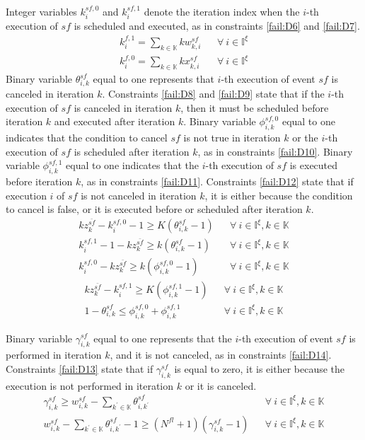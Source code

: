 \documentclass[suppldata]{interact}
\theoremstyle{plain}
\theoremstyle{definition}
\theoremstyle{remark}
\begin{document}
Integer variables $k^{sf,0}_i$ and $k^{sf,1}_{i}$ denote the iteration index when the $i$-th execution of ${sf}$ is scheduled and executed, as in constraints \eqref{fail:D6} and \eqref{fail:D7}. 
\begin{eqnarray}
	k^{f,1}_i=\sum_{k\in\mathbb{K}}kw^{sf}_{k,i}&&\forall\ i\in \mathbb{I}^{\xi}\label{fail:D6}\\
	k^{f,0}_i=\sum_{k\in\mathbb{K}}kx^{sf}_{k,i}&&\forall\ i\in \mathbb{I}^{\xi}\label{fail:D7}
\end{eqnarray}
Binary variable $\theta^{sf}_{i,k}$ equal to one represents that $i$-th execution of event ${sf}$ is canceled in iteration $k$. Constraints \eqref{fail:D8} and \eqref{fail:D9} state that if the $i$-th execution of ${sf}$ is canceled in iteration $k$, then it must be scheduled before iteration $k$ and executed after iteration $k$. Binary variable $\phi^{sf,0}_{i,k}$ equal to one indicates that the condition to cancel ${sf}$ is not true in iteration $k$ or the $i$-th execution of ${sf}$ is scheduled after iteration $k$, as in constraints \eqref{fail:D10}. Binary variable $\phi^{sf,1}_{i,k}$ equal to one indicates that the $i$-th execution of ${sf}$ is executed before iteration $k$, as in constraints \eqref{fail:D11}. Constraints \eqref{fail:D12} state that if execution $i$ of ${sf}$ is not canceled in iteration $k$, it is either because the condition to cancel is false, or it is executed before or scheduled after iteration $k$. 
\begin{eqnarray}
	kz^{\bar{sf}}_k -k^{sf,0}_i - 1 \ge K(\theta^{sf}_{i,k}-1)&&\forall\ i\in \mathbb{I}^{\xi},k\in \mathbb{K}\label{fail:D8}\\
	k^{sf,1}_i - 1 - kz^{\bar{sf}}_k \ge k(\theta^{sf}_{i,k}-1)&&\forall\  i\in \mathbb{I}^{\xi},k\in \mathbb{K}\label{fail:D9}\\
	k^{sf,0}_i - kz^{\bar{sf}}_k \ge k(\phi^{sf,0}_{i,k}-1)&&\forall\ i\in \mathbb{I}^{\xi},k\in \mathbb{K}\label{fail:D10}
\end{eqnarray}
\begin{eqnarray}
	kz^{\bar{sf}}_k - k^{sf,1}_i \ge K(\phi^{sf,1}_{i,k}-1)&&\forall\ i\in \mathbb{I}^{\xi},k\in \mathbb{K}\label{fail:D11}\\
	1-\theta^{sf}_{i,k} \le \phi^{sf,0}_{i,k} + \phi^{sf,1}_{i,k}&&\forall\ i\in \mathbb{I}^{\xi},k\in \mathbb{K}\label{fail:D12}
\end{eqnarray}

Binary variable $\gamma^{sf}_{i,k}$ equal to one represents that the $i$-th execution of event $sf$ is performed in iteration $k$, and it is not canceled, as in constraints \eqref{fail:D14}. Constraints \eqref{fail:D13} state that if $\gamma^{sf}_{i,k}$ is equal to zero, it is either because the execution is not performed in iteration $k$ or it is canceled. 
\begin{eqnarray}
	\gamma^{sf}_{i,k} \ge w^{sf}_{i,k} - \sum_{k^{'}\in \mathbb{K}}\theta^{sf}_{i,k^{'}}&&\forall\ i\in \mathbb{I}^{\xi},k\in \mathbb{K}\label{fail:D13}\\
	w^{sf}_{i,k} - \sum_{k^{'}\in \mathbb{K}}\theta^{sf}_{i,k^{'}} -1 \ge (N^{fl}+1)(\gamma^{sf}_{i,k}-1) &&\forall\ i\in \mathbb{I}^{\xi},k\in \mathbb{K}\label{fail:D14}
\end{eqnarray}
\end{document}

